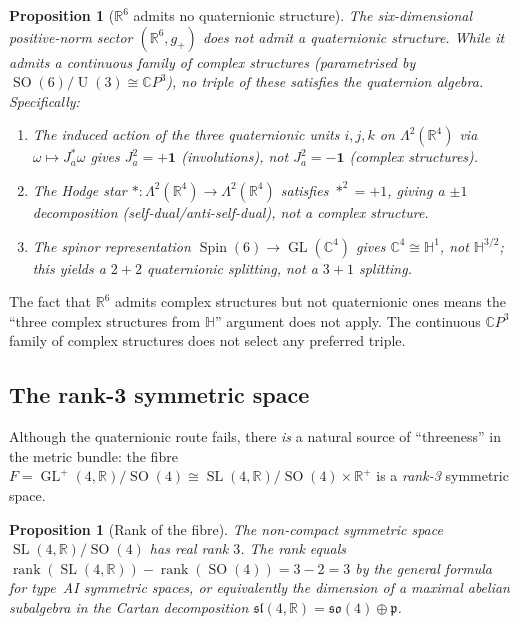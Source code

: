 \documentclass[12pt,a4paper]{article}
\newtheorem{proposition}[theorem]{Proposition}
\theoremstyle{definition}
\newcommand{\GL}{\operatorname{GL}}
\newcommand{\SO}{\operatorname{SO}}
\newcommand{\U}{\operatorname{U}}
\newcommand{\Spin}{\operatorname{Spin}}
\newcommand{\SL}{\operatorname{SL}}
\newcommand{\R}{\mathbb{R}}
\newcommand{\C}{\mathbb{C}}
\newcommand{\HH}{\mathbb{H}}
\begin{document}
\begin{proposition}[$\R^6$ admits no quaternionic structure]
\label{prop:no_quaternionic}
The six-dimensional positive-norm sector $(\R^6, g_+)$ does not admit a quaternionic structure.
While it admits a \emph{continuous family} of complex structures (parametrised by $\SO(6)/\U(3) \cong \C P^3$), no triple of these satisfies the quaternion algebra.
Specifically:
\begin{enumerate}[nosep]
\item The induced action of the three quaternionic units $i, j, k$ on $\Lambda^2(\R^4)$ via $\omega \mapsto J_a^* \omega$ gives $J_a^2 = +\mathbf{1}$ (involutions), not $J_a^2 = -\mathbf{1}$ (complex structures).
\item The Hodge star $*: \Lambda^2(\R^4) \to \Lambda^2(\R^4)$ satisfies $*^2 = +1$, giving a $\pm 1$ decomposition (self-dual/anti-self-dual), not a complex structure.
\item The spinor representation $\Spin(6) \to \GL(\C^4)$ gives $\C^4 \cong \HH^1$, not $\HH^{3/2}$; this yields a $2 + 2$ quaternionic splitting, not a $3 + 1$ splitting.
\end{enumerate}
\end{proposition}

The fact that $\R^6$ admits complex structures but not quaternionic ones means the ``three complex structures from $\HH$'' argument does not apply.
The continuous $\C P^3$ family of complex structures does not select any preferred triple.

\subsection{The rank-3 symmetric space}

Although the quaternionic route fails, there \emph{is} a natural source of ``threeness'' in the metric bundle: the fibre $F = \GL^+(4,\R)/\SO(4) \cong \SL(4,\R)/\SO(4) \times \R^+$ is a \emph{rank-3} symmetric space.

\begin{proposition}[Rank of the fibre]
\label{prop:rank3}
The non-compact symmetric space $\SL(4,\R)/\SO(4)$ has real rank $3$.
The rank equals $\operatorname{rank}(\SL(4,\R)) - \operatorname{rank}(\SO(4)) = 3 - 2 = 3$ by the general formula for type~AI symmetric spaces, or equivalently the dimension of a maximal abelian subalgebra in the Cartan decomposition $\mathfrak{sl}(4,\R) = \mathfrak{so}(4) \oplus \mathfrak{p}$.
\end{proposition}
\end{document}
